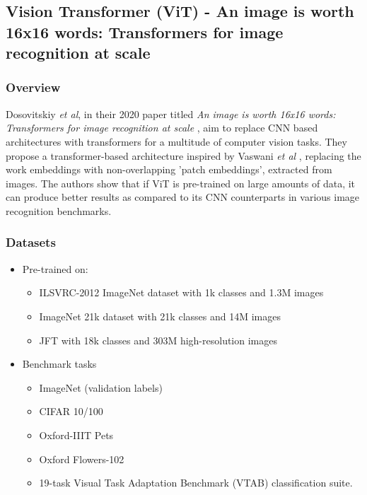 \subsection{Vision Transformer (ViT) - An image is worth 16x16 words: Transformers for image recognition at scale} \label{appendix:vit-paper}

\subsubsection{Overview}

\par Dosovitskiy \textit{et al}, in their 2020 paper titled \textit{An image is worth 16x16 words: Transformers for image recognition at scale} \cite{vit}, aim to replace CNN based architectures with transformers for a multitude of computer vision tasks. They propose a transformer-based architecture inspired by Vaswani \textit{et al} \cite{tfm}, replacing the work embeddings with non-overlapping 'patch embeddings', extracted from images. The authors show that if ViT is pre-trained on large amounts of data, it can produce better results as compared to its CNN counterparts in various image recognition benchmarks.\par


\subsubsection{Datasets}
\begin{itemize}
\item Pre-trained on:
	\begin{itemize}
		\item ILSVRC-2012 ImageNet dataset with 1k classes and 1.3M images
		\item ImageNet 21k dataset with 21k classes and 14M images 
		\item JFT with 18k classes and 303M high-resolution images
	\end{itemize}
\item Benchmark tasks
	\begin{itemize}
		\item ImageNet (validation labels)
		\item CIFAR 10/100
		\item Oxford-IIIT Pets
		\item Oxford Flowers-102
		\item 19-task Visual Task Adaptation Benchmark (VTAB) classification suite.
	\end{itemize}
\end{itemize}


